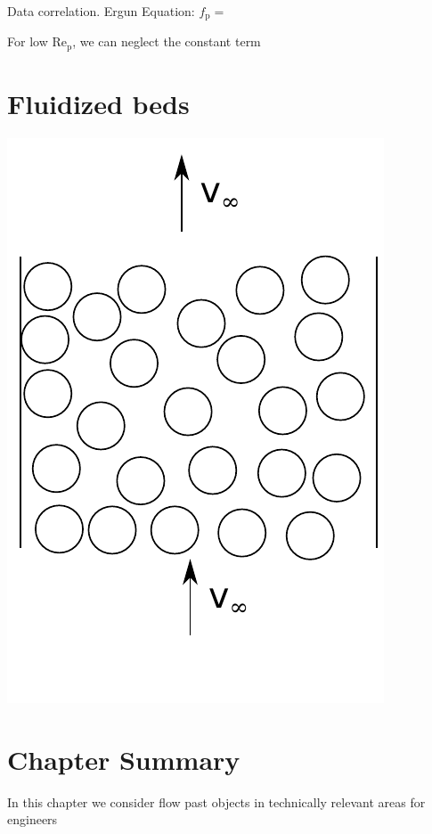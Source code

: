 \documentclass[paper=a4, fontsize=12pt]{scrartcl} %
\numberwithin{equation}{section} %
\numberwithin{figure}{section} %
\numberwithin{table}{section} %
\begin{document}
\vspace{0.5cm} Data correlation. Ergun Equation:  $f_{\text{p}}=$

\vspace{0.5cm} For low Re$_\text{p}$, we can neglect the constant term

\newpage

\section*{Fluidized beds}

 \includegraphics[scale=0.6]{packedbedvert.pdf}



\vspace{1cm}  \section*{Chapter Summary}

In this chapter we consider flow past objects in technically relevant areas for engineers
	
\end{document}
